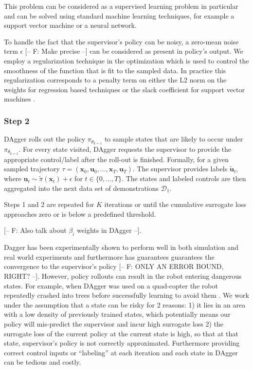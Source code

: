 \documentclass[10pt, conference]{ieeeconf}      %
\newcommand{\bu}{\mathbf{u}}
\newcommand{\bx}{\mathbf{x}}
\begin{document}
This problem can be considered as a supervised learning problem in particular and can be solved using standard machine
learning techniques, for example a support vector machine or a neural network. 
 
To handle the fact that the supervisor's policy can be noisy, a zero-mean noise term $\epsilon$ 
{ \color{blue} [-- F: Make precise --]}
can be considered as present in policy's output. We employ a regularization technique in the optimization which is
used to control the smoothness of the function that is fit to the sampled data. In practice this regularization corresponds to a penalty term on either the L2 norm on the weights for regression based techniques or the slack coefficient for support vector machines \cite{scholkopf2002learning}.
 
 \subsubsection{Step 2}
 DAgger rolls out the policy $\pi_{\theta_{k=1}}$ to sample states that are likely to occur under $\pi_{\theta_{k=1}}$.
 For every state visited, DAgger requests the supervisor to provide the appropriate control/label after the roll-out is
 finished. Formally, for a given sampled trajectory  $\tau = (\bx_0,\bu_0,...,\bx_T,\bu_T )$. The supervisor provides
 labels $\tilde{\bu}_t$, where $\bu_t \sim \tilde{\pi}(\bx_t) + \epsilon$ for $t\in \{0, \ldots, T\}$.
The states and labeled controls are then aggregated into the next data set of demonstrations $\mathcal{D}_1$. 

Steps 1 and 2 are repeated for $K$ iterations or until the cumulative surrogate loss approaches zero or is below a
predefined threshold. 

{\color{blue}[-- F: Also talk about $\beta_i$ weights in DAgger --]}. 

Dagger has been experimentally shown to perform  well in both simulation and real world experiments and furthermore
has guarantees guarantees the convergence to the supervisor's policy {\color{blue} [-- F: ONLY AN ERROR BOUND, RIGHT? --]}. 
However, policy rollouts can result in the robot entering dangerous states. For example, when DAgger was used on a
quad-copter the robot repeatedly crashed into trees before successfully learning to avoid them \cite{ross2013learning}.
We work under the assumption that a state can be risky for 2 reasons: 1) it lies in an area with a low density of
previously trained states, which potentially means our policy will mis-predict the supervisor and incur high surrogate
loss \cite{tokdar2010importance} 2) the surrogate loss of the current policy at the current state is high, so that at
that state, supervisor's policy is not correctly approximated. Furthermore providing correct control inputs or ``labeling'' at each
iteration and each state in DAgger can be tedious and costly.
\end{document}

